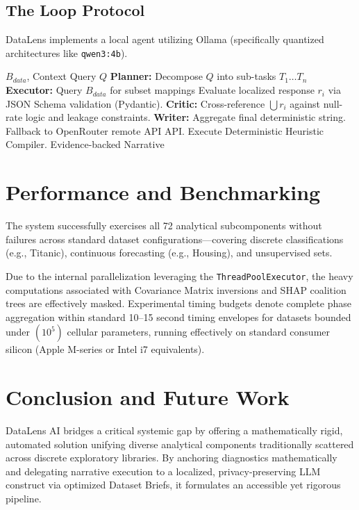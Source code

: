 \documentclass[conference]{IEEEtran}
\begin{document}
\subsection{The Loop Protocol}
DataLens implements a local agent utilizing Ollama (specifically quantized architectures like \texttt{qwen3:4b}). 
\begin{algorithm}[h]
\caption{LLM Agentic RAG Protocol}
\begin{algorithmic}[1]
\REQUIRE $B_{data}$, Context Query $Q$
\STATE \textbf{Planner:} Decompose $Q$ into sub-tasks $T_1 \dots T_n$
    \STATE \textbf{Executor:} Query $B_{data}$ for subset mappings
    \STATE Evaluate localized response $r_i$ via JSON Schema validation (Pydantic).
\ENDFOR
\STATE \textbf{Critic:} Cross-reference $\bigcup r_{i}$ against null-rate logic and leakage constraints. 
\STATE \textbf{Writer:} Aggregate final deterministic string.
    \STATE Fallback to OpenRouter remote API API.
\ENDIF
{}
    \STATE Execute Deterministic Heuristic Compiler.
\ENDIF
\RETURN Evidence-backed Narrative
\end{algorithmic}
\label{alg:agent}
\end{algorithm}

\section{Performance and Benchmarking}\label{sec:performance}
The system successfully exercises all 72 analytical subcomponents without failures across standard dataset configurations—covering discrete classifications (e.g., Titanic), continuous forecasting (e.g., Housing), and unsupervised sets. 

Due to the internal parallelization leveraging the \texttt{ThreadPoolExecutor}, the heavy computations associated with Covariance Matrix inversions and SHAP coalition trees are effectively masked. Experimental timing budgets denote complete phase aggregation within standard 10--15 second timing envelopes for datasets bounded under $(10^5)$ cellular parameters, running effectively on standard consumer silicon (Apple M-series or Intel i7 equivalents).

\section{Conclusion and Future Work}\label{sec:conclusion}
DataLens AI bridges a critical systemic gap by offering a mathematically rigid, automated solution unifying diverse analytical components traditionally scattered across discrete exploratory libraries. By anchoring diagnostics mathematically and delegating narrative execution to a localized, privacy-preserving LLM construct via optimized Dataset Briefs, it formulates an accessible yet rigorous pipeline.
\end{document}
